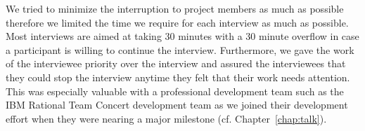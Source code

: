 We tried to minimize the interruption to project members as much as possible therefore we limited the time we require for each interview as much as possible.
Most interviews are aimed at taking 30 minutes with a 30 minute overflow in case a participant is willing to continue the interview.
Furthermore, we gave the work of the interviewee priority over the interview and assured the interviewees that they could stop the interview anytime they felt that their work needs attention.
This was especially valuable with a professional development team such as the IBM Rational Team Concert development team as we joined their development effort when they were nearing a major milestone (cf. Chapter~\ref{chap:talk}).











